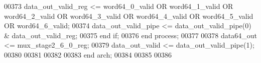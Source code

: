 \begin{DoxyCode}
00373       \textcolor{vhdlchar}{data_out_valid_reg}   \textcolor{vhdlchar}{<=} \textcolor{vhdlchar}{word64_0_valid} \textcolor{keywordflow}{OR} \textcolor{vhdlchar}{word64_1_valid} \textcolor{keywordflow}{OR} \textcolor{vhdlchar}{word64_2_valid} \textcolor{keywordflow}{OR} \textcolor{vhdlchar}{
      word64_3_valid} \textcolor{keywordflow}{OR} \textcolor{vhdlchar}{word64_4_valid} \textcolor{keywordflow}{OR} \textcolor{vhdlchar}{word64_5_valid} \textcolor{keywordflow}{OR} \textcolor{vhdlchar}{word64_6_valid};
00374       \textcolor{vhdlchar}{data_out_valid_pipe}  \textcolor{vhdlchar}{<=} \textcolor{vhdlchar}{data_out_valid_pipe}\textcolor{vhdlchar}{(}\textcolor{vhdllogic}{}\textcolor{vhdllogic}{0}\textcolor{vhdlchar}{)} \textcolor{vhdlchar}{&} \textcolor{vhdlchar}{data_out_valid_reg}; 
00375    \textcolor{keywordflow}{end} \textcolor{keywordflow}{if};
00376 \textcolor{keywordflow}{end} \textcolor{keywordflow}{process};
00377     
00378 \textcolor{vhdlchar}{data64_out}     \textcolor{vhdlchar}{<=} \textcolor{vhdlchar}{mux_stage2_6_0_reg};
00379 \textcolor{vhdlchar}{data_out_valid} \textcolor{vhdlchar}{<=} \textcolor{vhdlchar}{data_out_valid_pipe}\textcolor{vhdlchar}{(}\textcolor{vhdllogic}{}\textcolor{vhdllogic}{1}\textcolor{vhdlchar}{)};
00380 
00381  
00382 
00383 \textcolor{keywordflow}{end} \textcolor{vhdlchar}{arch};   
00384 
00385 
00386 
\end{DoxyCode}
